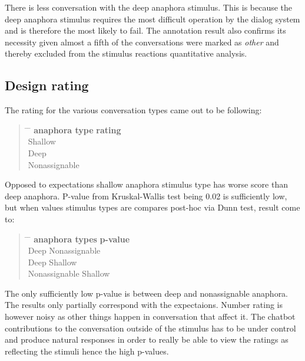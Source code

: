There is less conversation with the deep anaphora stimulus.
This is because the deep anaphora stimulus requires the most difficult operation by the dialog system
and is therefore the most likely to fail.
The annotation result also confirms its necessity
given almost a fifth of the conversations were marked as \textit{other} and
thereby excluded from the stimulus reactions quantitative analysis.

\subsection{Design rating}

The rating for the various conversation types came out to be following:

\begin{quote}
\begin{tabbing}
\hspace{4cm} \= \hspace{4cm} \= \kill %
\textbf{anaphora type} \> \textbf{rating} \\
Shallow  \\
Deep  \\
Nonassignable  \\
\end{tabbing}
\end{quote}

Opposed to expectations shallow anaphora stimulus type has worse score than deep anaphora.
P-value from Kruskal-Wallis test being 0.02 is sufficiently low, but
when values stimulus types are compares post-hoc via Dunn test,
result come to:

\begin{quote}
\begin{tabbing}
\hspace{4cm} \= \hspace{4cm} \= \kill %
\textbf{anaphora types} \> \> \textbf{p-value} \\
Deep \> Nonassignable  \\
Deep \> Shallow  \\
Nonassignable \> Shallow  \\
\end{tabbing}
\end{quote}

The only sufficiently low p-value is between deep and nonassignable anaphora.
The results only partially correspond with the expectaions.
Number rating is however noisy as other things happen in conversation that affect it.
The chatbot contributions to the conversation outside of the stimulus
has to be under control and produce natural responses in order to really be able
to view the ratings as reflecting the stimuli
hence the high p-values.


